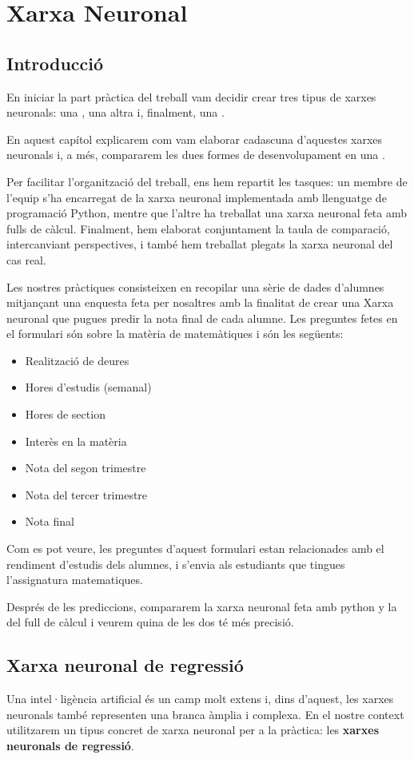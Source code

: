 \chapter{Xarxa Neuronal}
\section{Introducció}\label{sec:intr}
En iniciar la part pràctica del treball vam decidir crear tres tipus de xarxes neuronals: una , una altra  i, finalment, una .

En aquest capítol explicarem com vam elaborar cadascuna d’aquestes xarxes neuronals i, a més, compararem les dues formes de desenvolupament en una .

Per facilitar l’organització del treball, ens hem repartit les tasques: un membre de l’equip s’ha encarregat de la xarxa neuronal implementada amb llenguatge de programació Python, mentre que l’altre ha treballat una xarxa neuronal feta amb fulls de càlcul. Finalment, hem elaborat conjuntament la taula de comparació, intercanviant perspectives, i també hem treballat plegats la xarxa neuronal del cas real.

Les nostres pràctiques consisteixen en recopilar una sèrie de dades d'alumnes mitjançant una enquesta feta per nosaltres amb la finalitat de crear una Xarxa neuronal que pugues predir la nota final de cada alumne. Les preguntes fetes en el formulari són sobre la matèria de matemàtiques i són les següents:
\begin{itemize}
 \item Realització de deures
 \item Hores d'estudis (semanal)
 \item Hores de section
 \item Interès en la matèria
 \item Nota del segon trimestre
 \item Nota del tercer trimestre
 \item Nota final
\end{itemize}
Com es pot veure, les preguntes d'aquest formulari estan relacionades amb el rendiment d'estudis dels alumnes, i s'envia als estudiants que tingues l'assignatura matematiques.


Després de les prediccions, compararem la xarxa neuronal feta amb python y la del full de càlcul i veurem quina de les dos té més precisió.

\section{Xarxa neuronal de regressió}\label{sec:op}
Una intel·ligència artificial és un camp molt extens i, dins d’aquest, les xarxes neuronals també representen una branca àmplia i complexa.
En el nostre context utilitzarem un tipus concret de xarxa neuronal per a la pràctica: les \textbf{xarxes neuronals de regressió}.

